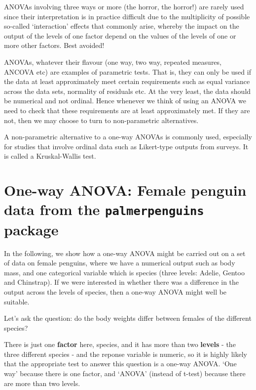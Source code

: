 \documentclass[
  letterpaper,
  DIV=11,
  numbers=noendperiod]{scrreprt}
\begin{document}
ANOVAs involving three ways or more (the horror, the horror!) are rarely
used since their interpretation is in practice difficult due to the
multiplicity of possible so-called `interaction' effects that commonly
arise, whereby the impact on the output of the levels of one factor
depend on the values of the levels of one or more other factors. Best
avoided!

ANOVAs, whatever their flavour (one way, two way, repeated measures,
ANCOVA etc) are examples of parametric tests. That is, they can only be
used if the data at least approximately meet certain requirements such
as equal variance across the data sets, normality of residuals etc. At
the very least, the data should be numerical and not ordinal. Hence
whenever we think of using an ANOVA we need to check that these
requirements are at least approximately met. If they are not, then we
may choose to turn to non-parametric alternatives.

A non-parametric alternative to a one-way ANOVAs is commonly used,
especially for studies that involve ordinal data such as Likert-type
outputs from surveys. It is called a Kruskal-Wallis test.

\section{\texorpdfstring{One-way ANOVA: Female penguin data from the
\texttt{palmerpenguins}
package}{One-way ANOVA: Female penguin data from the palmerpenguins package}}\label{one-way-anova-female-penguin-data-from-the-palmerpenguins-package}

In the following, we show how a one-way ANOVA might be carried out on a
set of data on female penguins, where we have a numerical output such as
body mass, and one categorical variable which is species (three levels:
Adelie, Gentoo and Chinstrap). If we were interested in whether there
was a difference in the output across the levels of species, then a
one-way ANOVA might well be suitable.

Let's ask the question: do the body weights differ between females of
the different species?

There is just one \textbf{factor} here, species, and it has more than
two \textbf{levels} - the three different species - and the reponse
variable is numeric, so it is highly likely that the appropriate test to
answer this question is a one-way ANOVA. `One way' because there is one
factor, and `ANOVA' (instead of t-test) because there are more than two
levels.
\end{document}
